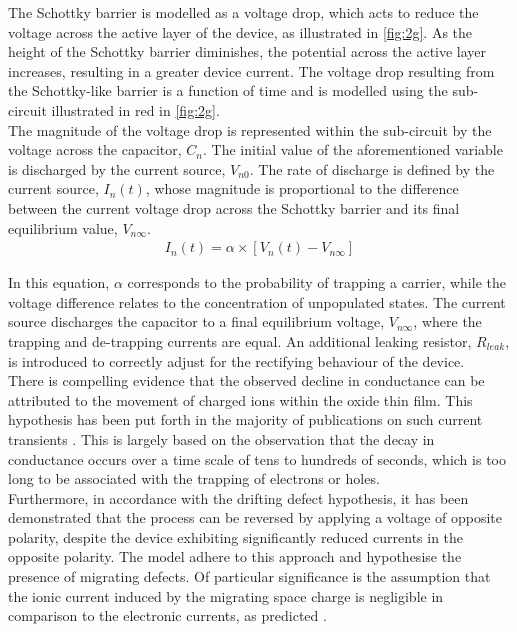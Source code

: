 \noindent The Schottky barrier is modelled as a voltage drop, which acts to reduce the voltage across the active layer of the device, as illustrated in \ref{fig:2g}. As the height of the Schottky barrier diminishes, the potential across the active layer increases, resulting in a greater device current. The voltage drop resulting from the Schottky-like barrier is a function of time and is modelled using the sub-circuit illustrated in red in \ref{fig:2g}. \\

\noindent The magnitude of the voltage drop is represented within the sub-circuit by the voltage across the capacitor, $C_n$. The initial value of the aforementioned variable is discharged by the current source, $V_{n0}$. The rate of discharge is defined by the current source, $I_n(t)$, whose magnitude is proportional to the difference between the current voltage drop across the Schottky barrier and its final equilibrium value, $V_{n\infty}$.
\begin{align}
I_n(t) = \alpha \times \left[ V_n(t) - V_{n\infty} \right] \label{eq:2.25} 
\end{align}

\noindent In this equation, $\alpha$ corresponds to the probability of trapping a carrier, while the voltage difference relates to the concentration of unpopulated states. The current source discharges the capacitor to a final equilibrium voltage, $V_{n\infty}$, where the trapping and de-trapping currents are equal. An additional leaking resistor, $R_{leak}$, is introduced to correctly adjust for the rectifying behaviour of the device.\\

\noindent There is compelling evidence that the observed decline in conductance can be attributed to the movement of charged ions within the oxide thin film. This hypothesis has been put forth in the majority of publications on such current transients \cite{wang2006oxygen}. This is largely based on the observation that the decay in conductance occurs over a time scale of tens to hundreds of seconds, which is too long to be associated with the trapping of electrons or holes. \\

\noindent Furthermore, in accordance with the drifting defect hypothesis, it has been demonstrated that the process can be reversed by applying a voltage of opposite polarity, despite the device exhibiting significantly reduced currents in the opposite polarity. The model adhere to this approach and hypothesise the presence of migrating defects. Of particular significance is the assumption that the ionic current induced by the migrating space charge is negligible in comparison to the electronic currents, as predicted \cite{meyer2005oxygen}. \\

